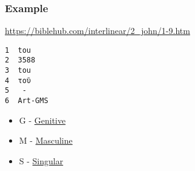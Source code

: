\documentclass[11pt]{article}
\begin{document}
\subsubsection{Example}
\label{sec:orgc680dc9}
\url{https://biblehub.com/interlinear/2\_john/1-9.htm}

\begin{verbatim}
1  tou
2  3588
3  tou
4  τοῦ
5   -
6  Art-GMS
\end{verbatim}

\begin{itemize}
\item G - \href{https://en.wikipedia.org/wiki/Grammatical\_case}{Genitive}
\item M - \href{https://en.wikipedia.org/wiki/Grammatical\_case}{Masculine}
\item S - \href{https://en.wikipedia.org/wiki/Grammatical\_case}{Singular}
\end{itemize}
\end{document}
